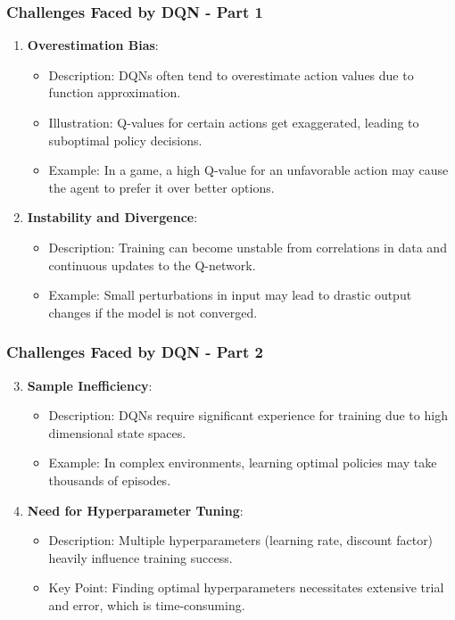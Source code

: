 \documentclass{beamer}
\begin{document}
\begin{frame}[fragile]
    \frametitle{Challenges Faced by DQN - Part 1}
    \begin{enumerate}
        \item \textbf{Overestimation Bias}:
        \begin{itemize}
            \item Description: DQNs often tend to overestimate action values due to function approximation.
            \item Illustration: Q-values for certain actions get exaggerated, leading to suboptimal policy decisions.
            \item Example: In a game, a high Q-value for an unfavorable action may cause the agent to prefer it over better options.
        \end{itemize}

        \item \textbf{Instability and Divergence}:
        \begin{itemize}
            \item Description: Training can become unstable from correlations in data and continuous updates to the Q-network.
            \item Example: Small perturbations in input may lead to drastic output changes if the model is not converged.
        \end{itemize}
    \end{enumerate}
\end{frame}

\begin{frame}[fragile]
    \frametitle{Challenges Faced by DQN - Part 2}
    \begin{enumerate}
        \setcounter{enumi}{2}
        \item \textbf{Sample Inefficiency}:
        \begin{itemize}
            \item Description: DQNs require significant experience for training due to high dimensional state spaces.
            \item Example: In complex environments, learning optimal policies may take thousands of episodes.
        \end{itemize}

        \item \textbf{Need for Hyperparameter Tuning}:
        \begin{itemize}
            \item Description: Multiple hyperparameters (learning rate, discount factor) heavily influence training success.
            \item Key Point: Finding optimal hyperparameters necessitates extensive trial and error, which is time-consuming.
        \end{itemize}
    \end{enumerate}
\end{frame}
\end{document}
